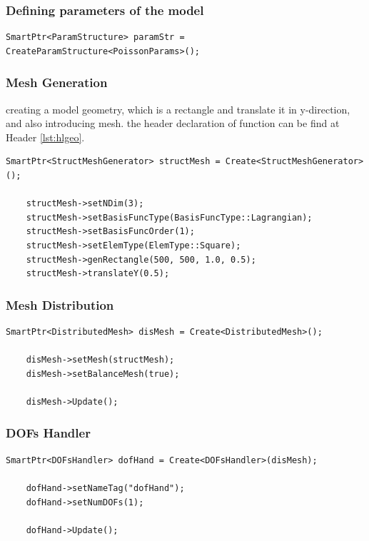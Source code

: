 \documentclass[]{article}
\begin{document}
\subsubsection{Defining parameters of the model} \label{sec: Pstr}

\begin{lstlisting}[firstnumber=38]
	SmartPtr<ParamStructure> paramStr = CreateParamStructure<PoissonParams>();
\end{lstlisting}

\subsubsection{Mesh Generation} \label{sec: mshG}
creating a model geometry, which is a rectangle and translate it in y-direction, and also introducing mesh. the header declaration of function can be find at Header \ref{lst:hlgeo}. 
\begin{lstlisting}[firstnumber=39]
	SmartPtr<StructMeshGenerator> structMesh = Create<StructMeshGenerator>();
	
	structMesh->setNDim(3);
	structMesh->setBasisFuncType(BasisFuncType::Lagrangian);
	structMesh->setBasisFuncOrder(1);
	structMesh->setElemType(ElemType::Square);
	structMesh->genRectangle(500, 500, 1.0, 0.5);
	structMesh->translateY(0.5);
\end{lstlisting}

\subsubsection{Mesh Distribution} \label{sec: mshD}
\begin{lstlisting}[firstnumber=47]
	SmartPtr<DistributedMesh> disMesh = Create<DistributedMesh>();
	
	disMesh->setMesh(structMesh);
	disMesh->setBalanceMesh(true);
	
	disMesh->Update();
\end{lstlisting}

\subsubsection{DOFs Handler} \label{sec: dofC}
\begin{lstlisting}[firstnumber=53]
	SmartPtr<DOFsHandler> dofHand = Create<DOFsHandler>(disMesh);
	
	dofHand->setNameTag("dofHand");
	dofHand->setNumDOFs(1);
	
	dofHand->Update();
\end{lstlisting}
\end{document}
